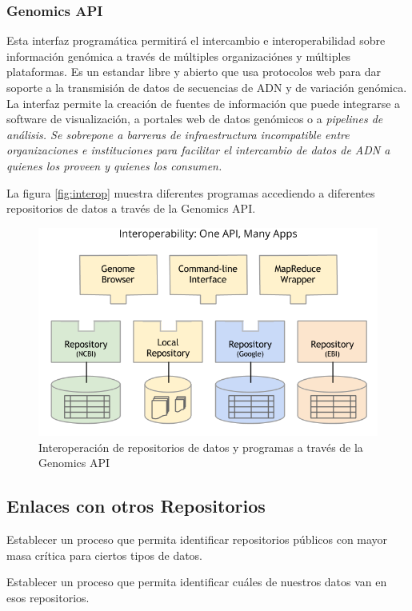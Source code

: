 \documentclass[
10pt, %
letterpaper, %
oneside, %
headinclude,footinclude, %
BCOR5mm, %
]{scrartcl}
\begin{document}
\subsubsection{Genomics API}

Esta interfaz programática permitirá el intercambio e
interoperabilidad sobre información genómica a través de múltiples
organizaciónes y múltiples plataformas. Es un estandar libre y abierto
que usa protocolos web para dar soporte a la transmisión de datos de
secuencias de ADN y de variación genómica. La interfaz permite la
creación de fuentes de información que puede integrarse a software de
visualización, a portales web de datos genómicos o a \em{pipelines}\em
de análisis. Se sobrepone a barreras de infraestructura incompatible
entre organizaciones e instituciones para facilitar el intercambio de
datos de ADN a quienes los proveen y quienes los consumen.

La figura \vref{fig:interop} muestra diferentes programas accediendo a
diferentes repositorios de datos a través de la Genomics API.

\begin{figure}
\centering 
\includegraphics[width=0.8\columnwidth]{GA4GH_API_interop.png} 
\caption[]{Interoperación de repositorios de datos y programas a
  través de la Genomics API}
\label{fig:interop} 
\end{figure}



\subsection{Enlaces con otros Repositorios}
Establecer un proceso que permita identificar repositorios públicos
con mayor masa crítica para ciertos tipos de datos.

Establecer un proceso que permita identificar cuáles de nuestros datos
van en esos repositorios.
\cite{_genebank_????}
\cite{king_introduction_2007}
\end{document}
